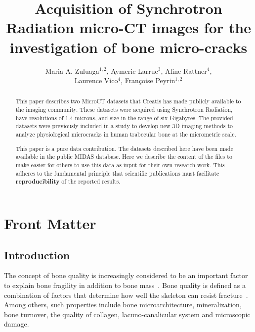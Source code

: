 \documentclass{InsightArticle}
\title{Acquisition of Synchrotron Radiation micro-CT images for the investigation of bone
micro-cracks}
\author{Maria A. Zuluaga$^{1,2}$, Aymeric Larrue$^{3}$, Aline Rattner$^{4}$, \\Laurence Vico$^{4}$, Fran\c{c}oise Peyrin$^{1,2}$}
\newcommand{\IJhandlerIDnumber}{3261}
\begin{document}
%
%
\IJhandlefooter{\IJhandlerIDnumber}


\ifpdf
\else
\fi


\maketitle


\ifhtml
\chapter*{Front Matter\label{front}}
\fi


\begin{abstract}
\noindent
This paper describes two MicroCT datasets that Creatis has made publicly
available to the imaging community. These datasets were acquired using
Synchrotron Radiation, have resolutions of 1.4 microns, and size in the range of
six Gigabytes. The provided datasets were previously included in a study to develop
new 3D imaging methods to analyze physiological microcracks in
human trabecular bone at the micrometric scale.

This paper is a pure data contribution. The datasets described here have been
made available in the public MIDAS database. Here we describe the content of
the files to make easier for others to use this data as input for their own
research work.  This adheres to the fundamental principle that scientific
publications must facilitate \textbf{reproducibility} of the reported results.
\end{abstract}

\tableofcontents

\section{Introduction}
The concept of bone quality is increasingly considered to be an important factor
to explain bone fragility in addition to bone mass~\cite{Seeman2008}.
Bone quality is defined as a combination of factors that determine how well
the skeleton can resist fracture~\cite{Licata2009}. Among others, such
properties include bone microarchitecture, mineralization, bone turnover, the
quality of collagen, lacuno-canalicular system and microscopic damage.
\end{document}
